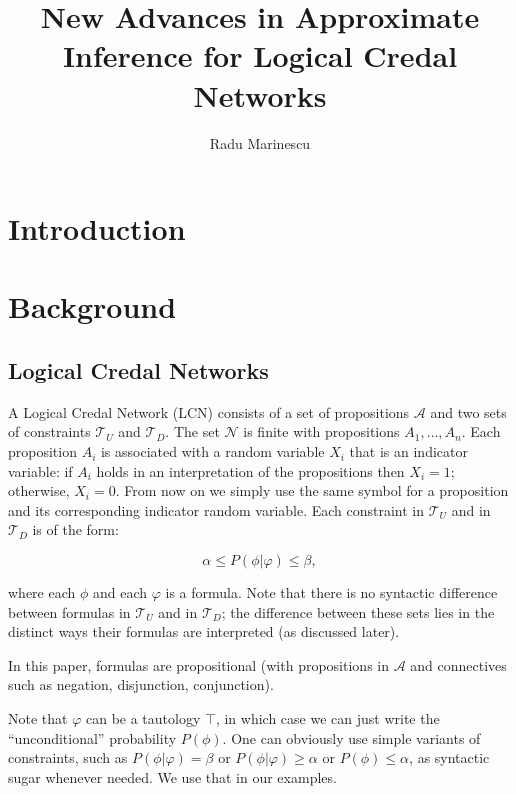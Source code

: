 \documentclass{article}
\title{New Advances in Approximate Inference for Logical Credal Networks}
\author{Radu Marinescu}
\date{}
\begin{document}
\maketitle

\section{Introduction}

\section{Background}
\label{sec-background}

\subsection{Logical Credal Networks}

A Logical Credal Network (LCN) consists of a set of propositions $\mathcal{A}$ and two sets of constraints $\mathcal{T}_U$ and $\mathcal{T}_D$. The set $\mathcal{N}$ is finite with  propositions $A_1, \dots, A_n$. Each proposition $A_i$ is associated with a random variable $X_i$ that is an indicator variable: if $A_i$ holds in an interpretation of the propositions then $X_i=1$; otherwise, $X_i=0$. From now on we simply use the same symbol for a proposition and its corresponding indicator random variable.  Each constraint in $\mathcal{T}_U$ and in $\mathcal{T}_D$ is of the form:

\begin{equation}
\alpha \leq P(\phi|\varphi) \leq \beta,
\end{equation}

\noindent where each $\phi$ and each $\varphi$ is a formula. Note that there is no syntactic difference between formulas in $\mathcal{T}_U$ and in $\mathcal{T}_D$; the difference between these sets lies in the distinct ways their formulas are interpreted (as discussed later).

In this paper, formulas are propositional (with propositions in $\mathcal{A}$ and connectives such as negation, disjunction, conjunction).

Note that $\varphi$ can be a tautology $\top$, in which case we can just write the ``unconditional'' probability $P(\phi)$.
One can obviously use simple variants of constraints, such as $P(\phi|\varphi) = \beta$ or $P(\phi|\varphi) \geq \alpha$ or $P(\phi)\leq \alpha$, as syntactic sugar whenever needed. We use that in our examples. 
\end{document}
